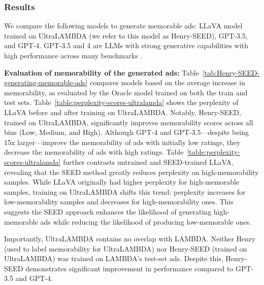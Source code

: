 











\subsubsection{Results}  
We compare the following models to generate memorable ads: LLaVA model trained on UltraLAMBDA (we refer to this model as Henry-SEED), GPT-3.5, and GPT-4. GPT-3.5 and 4 are LLMs with strong generative capabilities with high performance across many benchmarks \cite{brown2020language}. 


\textbf{Evaluation of memorability of the generated ads:} 
Table~\ref{tab:Henry-SEED-generating-memorable-ads} compares models based on the average increase in memorability, as evaluated by the Oracle model trained on both the train and test sets. Table~\ref{table:perplexity-scores-ultralamda} shows the perplexity of LLaVA before and after training on UltraLAMBDA. Notably, Henry-SEED, trained on UltraLAMBDA, significantly improves memorability scores across all bins (Low, Medium, and High). Although GPT-4 and GPT-3.5—despite being 15x larger—improve the memorability of ads with initially low ratings, they decrease the memorability of ads with high ratings. Table~\ref{table:perplexity-scores-ultralamda} further contrasts untrained and SEED-trained LLaVA, revealing that the SEED method greatly reduces perplexity on high-memorability samples. While LLaVA originally had higher perplexity for high-memorable samples, training on UltraLAMBDA shifts this trend: perplexity increases for low-memorability samples and decreases for high-memorability ones. This suggests the SEED approach enhances the likelihood of generating high-memorable ads while reducing the likelihood of producing low-memorable ones.


Importantly, UltraLAMBDA contains no overlap with LAMBDA. Neither Henry (used to label memorability for UltraLAMBDA) nor Henry-SEED (trained on UltraLAMBDA) was trained on LAMBDA’s test-set ads. Despite this, Henry-SEED demonstrates significant improvement in performance compared to GPT-3.5 and GPT-4.


